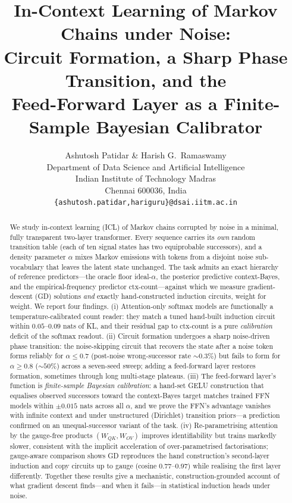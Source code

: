 \documentclass{article} %
\title{In-Context Learning of Markov Chains under Noise:\\
Circuit Formation, a Sharp Phase Transition, and the\\
Feed-Forward Layer as a Finite-Sample Bayesian Calibrator}
\author{Ashutosh Patidar \& Harish G.\ Ramaswamy\\
Department of Data Science and Artificial Intelligence\\
Indian Institute of Technology Madras\\
Chennai 600036, India\\
\texttt{\{ashutosh.patidar,hariguru\}@dsai.iitm.ac.in}
}
\newcommand{\ctxcount}{\textsf{ctx-count}}
\newcommand{\ctxbayes}{\textsf{context-Bayes}}
\newcommand{\idealalpha}{\textsf{ideal-$\alpha$}}
\newcommand{\WQK}{W_{QK}}
\newcommand{\WOV}{W_{OV}}
\begin{document}
\maketitle

\begin{abstract}
We study in-context learning (ICL) of Markov chains corrupted by noise in a minimal,
fully transparent two-layer transformer. Every sequence carries its \emph{own} random
transition table (each of ten signal states has two equiprobable successors), and a
density parameter $\alpha$ mixes Markov emissions with tokens from a disjoint noise
sub-vocabulary that leaves the latent state unchanged. The task admits an exact
hierarchy of reference predictors---the oracle floor \idealalpha{}, the posterior
predictive \ctxbayes{}, and the empirical-frequency predictor \ctxcount{}---against
which we measure gradient-descent (GD) solutions \emph{and} exactly hand-constructed
induction circuits, weight for weight. We report four findings. (i) Attention-only
softmax models are functionally a temperature-calibrated count reader: they match a
tuned hand-built induction circuit within $0.05$--$0.09$ nats of KL, and their
residual gap to \ctxcount{} is a pure \emph{calibration} deficit of the softmax
readout. (ii) Circuit formation undergoes a sharp noise-driven phase transition: the
noise-skipping circuit that recovers the state after a noise token forms reliably for
$\alpha\le 0.7$ (post-noise wrong-successor rate ${\sim}0.3\%$) but fails to form for
$\alpha\ge 0.8$ (${\sim}50\%$) across a seven-seed sweep; adding a feed-forward layer
restores formation, sometimes through long multi-stage plateaus. (iii) The
feed-forward layer's function is \emph{finite-sample Bayesian calibration}: a hand-set
GELU construction that equalises observed successors toward the \ctxbayes{} target
matches trained FFN models within $\pm0.015$ nats across all $\alpha$, and we prove
the FFN's advantage vanishes with infinite context and under unstructured (Dirichlet)
transition priors---a prediction confirmed on an unequal-successor variant of the
task. (iv) Re-parametrising attention by the gauge-free products
$(\WQK,\WOV)$ improves identifiability but trains markedly slower, consistent with
the implicit acceleration of over-parametrised factorisations; gauge-aware comparison
shows GD reproduces the hand construction's second-layer induction and copy circuits
up to gauge (cosine $0.77$--$0.97$) while realising the first layer differently.
Together these results give a mechanistic, construction-grounded account of what
gradient descent finds---and when it fails---in statistical induction heads under noise.
\end{abstract}
\end{document}

